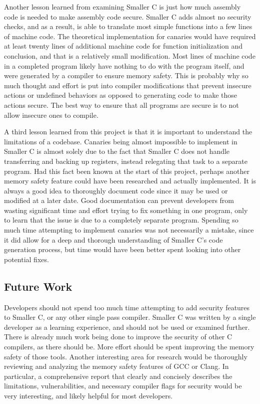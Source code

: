 \documentclass[sigconf, anonymous]{acmart}
\begin{document}
Another lesson learned from examining Smaller C is just how much assembly code is needed to make assembly code secure. Smaller C adds almost no security checks, and as a result, is able to translate most simple functions into a few lines of machine code. The theoretical implementation for canaries would have required at least twenty lines of additional machine code for function initialization and conclusion, and that is a relatively small modification. Most lines of machine code in a completed program likely have nothing to do with the program itself, and were generated by a compiler to ensure memory safety. This is probably why so much thought and effort is put into compiler modifications that prevent insecure actions or undefined behaviors as opposed to generating code to make those actions secure. The best way to ensure that all programs are secure is to not allow insecure ones to compile.

A third lesson learned from this project is that it is important to understand the limitations of a codebase. Canaries being almost impossible to implement in Smaller C is almost solely due to the fact that Smaller C does not handle transferring and backing up registers, instead relegating that task to a separate program. Had this fact been known at the start of this project, perhaps another memory safety feature could have been researched and actually implemented. It is always a good idea to thoroughly document code since it may be used or modified at a later date. Good documentation can prevent developers from wasting significant time and effort trying to fix something in one program, only to learn that the issue is due to a completely separate program. Spending so much time attempting to implement canaries was not necessarily a mistake, since it did allow for a deep and thorough understanding of Smaller C’s code generation process, but time would have been better spent looking into other potential fixes. 

\subsection{Future Work}

Developers should not spend too much time attempting to add security features to Smaller C, or any other single pass compiler. Smaller C was written by a single developer as a learning experience, and should not be used or examined further. There is already much work being done to improve the security of other C compilers, as there should be. More effort should be spent improving the memory safety of those tools. Another interesting area for research would be thoroughly reviewing and analyzing the memory safety features of GCC or Clang. In particular, a comprehensive report that clearly and concisely describes the limitations, vulnerabilities, and necessary compiler flags for security would be very interesting, and likely helpful for most developers.
\end{document}
